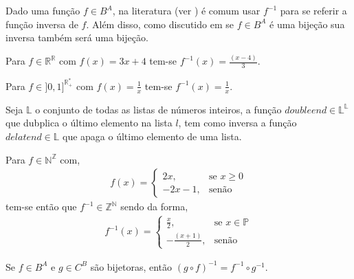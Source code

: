 \begin{nota}
  Dado uma função $f \in B^A$, na literatura (ver \cite{lipschutz1978-TC, lipschutz2013-MD}) é comum usar $f^{-1}$ para se referir a função inversa de $f$. Além disso, como discutido em \cite{carmo2013} se $f \in B^A$ é uma bijeção sua inversa também será uma bijeção.
\end{nota}

\begin{exemplo}\label{exe:FuncaoInversa1}
	Para $f \in \mathbb{R}^\mathbb{R}$ com $f(x) = 3x + 4$ tem-se $f^{-1}(x) = \frac{(x - 4)}{3}$.
\end{exemplo}

\begin{exemplo}\label{exe:FuncaoInversa2}
	Para $f \in ]0,1]^{\mathbb{R}^*_+}$ com $f(x) = \frac{1}{x}$ tem-se $f^{-1}(x) = \frac{1}{x}$.
\end{exemplo}

\begin{exemplo}\label{exe:FuncaoInversa3}
	Seja $\mathbb{L}$ o conjunto de todas as listas de números inteiros, a função $doubleend \in \mathbb{L}^\mathbb{L}$ que dubplica o último elemento na lista $l$, tem como inversa a função $delatend \in \mathbb{L}$ que apaga o último elemento de uma lista.
\end{exemplo}

\begin{exemplo}\label{exe:FuncaoInversa4}
	Para $f \in \mathbb{N}^\mathbb{Z}$ com, 
	\begin{eqnarray*}
		f(x) = \left\{\begin{array}{ll}
			2x, & \text{se } x \geq 0\\
			-2x - 1, & \text{senão}
		\end{array}\right.
	\end{eqnarray*}
	tem-se então que $f^{-1} \in \mathbb{Z}^\mathbb{N}$ sendo da forma,
	\begin{eqnarray*}
		f^{-1}(x) = \left\{\begin{array}{ll}
			\frac{x}{2}, & \text{se } x \in \mathbb{P}\\
			-\frac{(x + 1)}{2}, & \text{senão}
		\end{array}\right.
	\end{eqnarray*}
\end{exemplo}

\begin{teorema}
	Se $f \in B^A$ e $g \in C^B$ são bijetoras, então $(g \circ f)^{-1} = f^{-1} \circ g^{-1}$.
\end{teorema}

